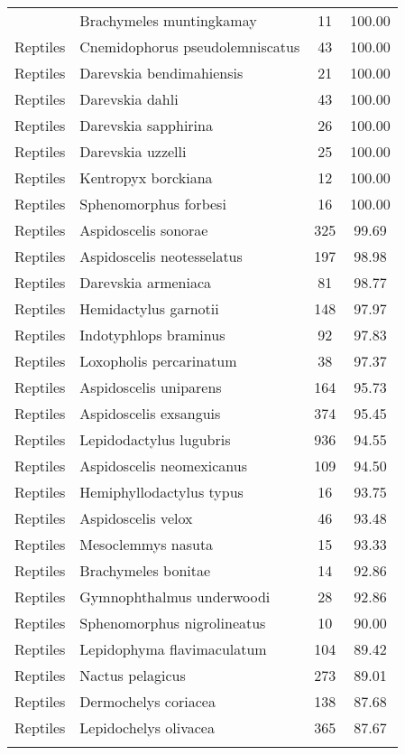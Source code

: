 \begin{longtable}{llcc}
{  Reptiles & Brachymeles muntingkamay &  11 & 100.00 \\ 
  Reptiles & Cnemidophorus pseudolemniscatus &  43 & 100.00 \\ 
  Reptiles & Darevskia bendimahiensis &  21 & 100.00 \\ 
  Reptiles & Darevskia dahli &  43 & 100.00 \\ 
  Reptiles & Darevskia sapphirina &  26 & 100.00 \\ 
  Reptiles & Darevskia uzzelli &  25 & 100.00 \\ 
  Reptiles & Kentropyx borckiana &  12 & 100.00 \\ 
  Reptiles & Sphenomorphus forbesi &  16 & 100.00 \\ 
  Reptiles & Aspidoscelis sonorae & 325 & 99.69 \\ 
  Reptiles & Aspidoscelis neotesselatus & 197 & 98.98 \\ 
  Reptiles & Darevskia armeniaca &  81 & 98.77 \\ 
  Reptiles & Hemidactylus garnotii & 148 & 97.97 \\ 
  Reptiles & Indotyphlops braminus &  92 & 97.83 \\ 
  Reptiles & Loxopholis percarinatum &  38 & 97.37 \\ 
  Reptiles & Aspidoscelis uniparens & 164 & 95.73 \\ 
  Reptiles & Aspidoscelis exsanguis & 374 & 95.45 \\ 
  Reptiles & Lepidodactylus lugubris & 936 & 94.55 \\ 
  Reptiles & Aspidoscelis neomexicanus & 109 & 94.50 \\ 
  Reptiles & Hemiphyllodactylus typus &  16 & 93.75 \\ 
  Reptiles & Aspidoscelis velox &  46 & 93.48 \\ 
  Reptiles & Mesoclemmys nasuta &  15 & 93.33 \\ 
  Reptiles & Brachymeles bonitae &  14 & 92.86 \\ 
  Reptiles & Gymnophthalmus underwoodi &  28 & 92.86 \\ 
  Reptiles & Sphenomorphus nigrolineatus &  10 & 90.00 \\ 
  Reptiles & Lepidophyma flavimaculatum & 104 & 89.42 \\ 
  Reptiles & Nactus pelagicus & 273 & 89.01 \\ 
  Reptiles & Dermochelys coriacea & 138 & 87.68 \\ 
  Reptiles & Lepidochelys olivacea & 365 & 87.67 \\ 
}
\end{longtable}
